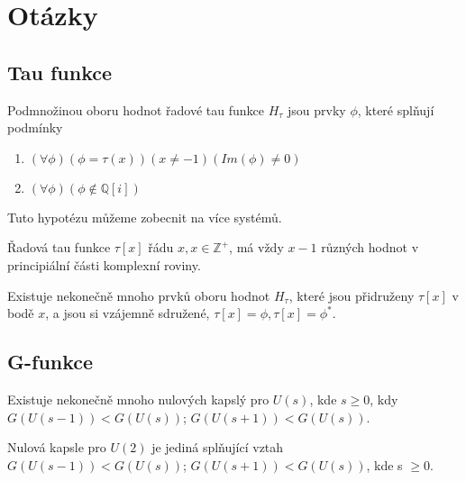\section{Otázky}

\subsection{Tau funkce}

\begin{conjecture}
      Podmnožinou oboru hodnot řadové tau funkce \(H_\tau\) 
      jsou prvky \(\phi\), které splňují podmínky
      \begin{enumerate}
            \item \((\forall \phi)(\phi = \tau(x))(x \neq -1)(Im(\phi) \neq 0)\)
            \item \((\forall \phi)(\phi \notin \mathbb{Q}[i])\)
      \end{enumerate}
\end{conjecture}

Tuto hypotézu můžeme zobecnit na více systémů.

\begin{conjecture}
      Řadová tau funkce \(\tau[x]\) řádu \(x, x \in 
      \mathbb{Z}^+\), má vždy \(x - 1\) různých hodnot
      v principiální části komplexní roviny.
\end{conjecture}

\begin{conjecture}
      Existuje nekonečně mnoho prvků oboru hodnot \(H_ \tau\), 
      které jsou přidruženy \(\tau[x]\) v bodě \(x\), a jsou si 
      vzájemně sdružené, \(\tau[x] = \phi, \tau[x] = \phi^*.\)
\end{conjecture}

\subsection{G-funkce}

\begin{conjecture}
      Existuje nekonečně mnoho nulových kapslý pro 
      \(U(s)\), kde \(s \geq 0\), kdy \(G(U(s-1)) <
      G(U(s))\); \(G(U(s+1)) < G(U(s))\).
\end{conjecture}
 
\begin{conjecture}
      Nulová kapsle pro \(U(2)\) je jediná splňující 
      vztah \(G(U(s-1)) < G(U(s))\); \(G(U(s+1)) 
      < G(U(s))\), kde s \(\geq 0\).
\end{conjecture}
 
